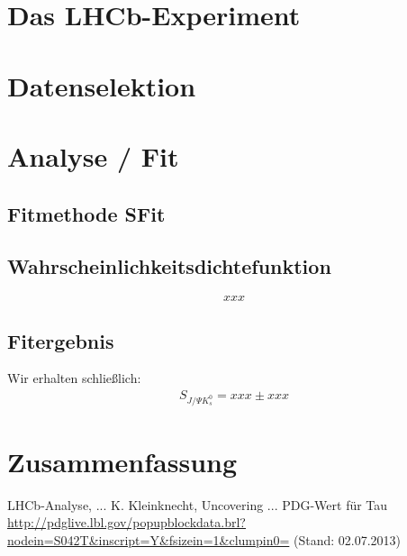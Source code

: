 \documentclass[a4paper]{scrbook}
\newcommand{\SJPsi}{S_{J/\Psi K_s^0}}
\begin{document}

\tableofcontents
\chapter{Das LHCb-Experiment}



\chapter{Datenselektion}

\chapter{Analyse / Fit}
\section{Fitmethode SFit}
\section{Wahrscheinlichkeitsdichtefunktion}
\begin{equation}
xxx     \label{eg:fit_pdf}
\end{equation}
\section{Fitergebnis} \label{kap:fitergebnis}
Wir erhalten schließlich:
\begin{align}
\SJPsi = xxx \pm xxx     \label{eq:fit_result}
\end{align}



\chapter{Zusammenfassung}

\begin{thebibliography}{---}
 LHCb-Analyse, ...
  K. Kleinknecht, Uncovering ...
 PDG-Wert für Tau \\ \url{http://pdglive.lbl.gov/popupblockdata.brl?nodein=S042T&inscript=Y&fsizein=1&clumpin0=} (Stand: 02.07.2013)
\end{thebibliography}

\printglossaries 

\end{document}
